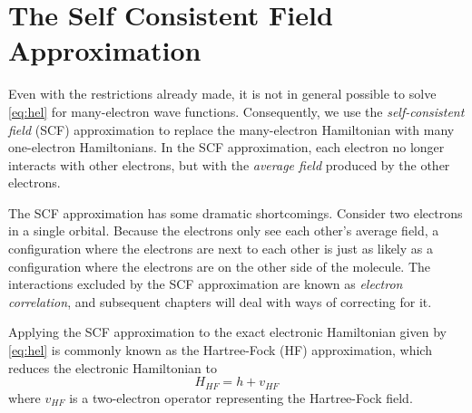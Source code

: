 \section{The Self Consistent Field Approximation}
\label{sec:scf}
Even with the restrictions already made, it is not in general possible
to solve \ref{eq:hel} for many-electron wave functions. Consequently,
we use the \emph{self-consistent field} (SCF) approximation to replace
the many-electron Hamiltonian with many one-electron Hamiltonians. In
the SCF approximation, each electron no longer interacts with other
electrons, but with the \emph{average field} produced by the other
electrons. 

The SCF approximation has some dramatic shortcomings. Consider two
electrons in a single orbital. Because the electrons only see each
other's average field, a configuration where the electrons are next to
each other is just as likely as a configuration where the electrons
are on the other side of the molecule. The interactions
excluded by the SCF approximation are known as \emph{electron
correlation}, and subsequent chapters will deal with ways of
correcting for it.

Applying the SCF approximation to the exact electronic Hamiltonian
given by \ref{eq:hel} is commonly known as the Hartree-Fock (HF)
approximation, which reduces the electronic
Hamiltonian to 
\begin{equation}
	H_{HF} = h + v_{HF}	
\end{equation}
where $v_{HF}$ is a two-electron operator representing the
Hartree-Fock field. 

